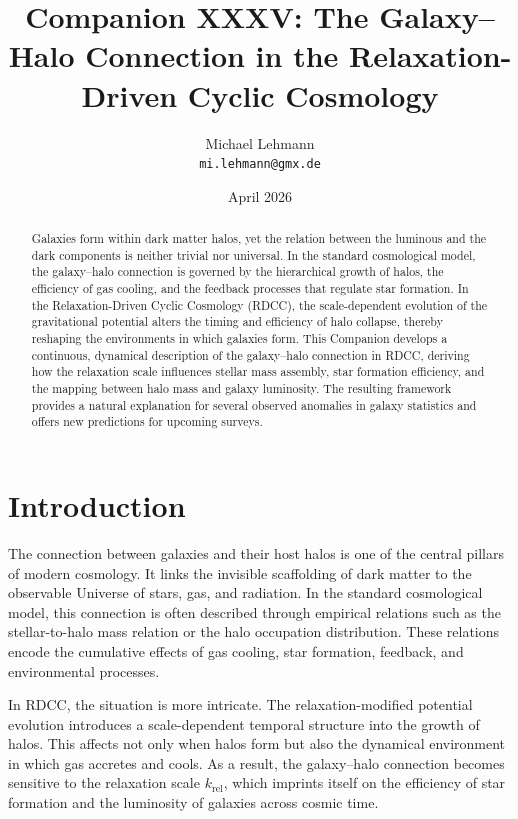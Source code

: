 \documentclass[11pt,a4paper]{article}
\title{\textbf{Companion XXXV: The Galaxy–Halo Connection in the Relaxation-Driven Cyclic Cosmology}}
\author{Michael Lehmann \\ \texttt{mi.lehmann@gmx.de}}
\date{April 2026}
\begin{document}
\maketitle

\begin{abstract}
Galaxies form within dark matter halos, yet the relation between the luminous and 
the dark components is neither trivial nor universal. In the standard cosmological 
model, the galaxy–halo connection is governed by the hierarchical growth of halos, 
the efficiency of gas cooling, and the feedback processes that regulate star 
formation. In the Relaxation-Driven Cyclic Cosmology (RDCC), the scale-dependent 
evolution of the gravitational potential alters the timing and efficiency of halo 
collapse, thereby reshaping the environments in which galaxies form. This Companion 
develops a continuous, dynamical description of the galaxy–halo connection in RDCC, 
deriving how the relaxation scale influences stellar mass assembly, star formation 
efficiency, and the mapping between halo mass and galaxy luminosity. The resulting 
framework provides a natural explanation for several observed anomalies in galaxy 
statistics and offers new predictions for upcoming surveys.
\end{abstract}
\section{Introduction}

The connection between galaxies and their host halos is one of the central pillars 
of modern cosmology. It links the invisible scaffolding of dark matter to the 
observable Universe of stars, gas, and radiation. In the standard cosmological 
model, this connection is often described through empirical relations such as the 
stellar-to-halo mass relation or the halo occupation distribution. These relations 
encode the cumulative effects of gas cooling, star formation, feedback, and 
environmental processes.

In RDCC, the situation is more intricate. The relaxation-modified potential 
evolution introduces a scale-dependent temporal structure into the growth of halos. 
This affects not only when halos form but also the dynamical environment in which 
gas accretes and cools. As a result, the galaxy–halo connection becomes sensitive 
to the relaxation scale $k_{\mathrm{rel}}$, which imprints itself on the efficiency 
of star formation and the luminosity of galaxies across cosmic time.
\end{document}

